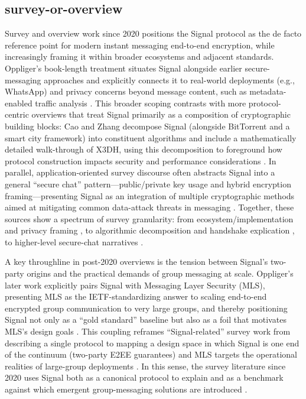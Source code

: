 \subsection{survey-or-overview}
Survey and overview work since 2020 positions the Signal protocol as the de facto reference point for modern instant messaging end-to-end encryption, while increasingly framing it within broader ecosystems and adjacent standards. Oppliger’s book-length treatment situates Signal alongside earlier secure-messaging approaches and explicitly connects it to real-world deployments (e.g., WhatsApp) and privacy concerns beyond message content, such as metadata-enabled traffic analysis \cite{oppliger2020}. This broader scoping contrasts with more protocol-centric overviews that treat Signal primarily as a composition of cryptographic building blocks: Cao and Zhang decompose Signal (alongside BitTorrent and a smart city framework) into constituent algorithms and include a mathematically detailed walk-through of X3DH, using this decomposition to foreground how protocol construction impacts security and performance considerations \cite{cao2022}. In parallel, application-oriented survey discourse often abstracts Signal into a general “secure chat” pattern—public/private key usage and hybrid encryption framing—presenting Signal as an integration of multiple cryptographic methods aimed at mitigating common data-attack threats in messaging \cite{p2023}. Together, these sources show a spectrum of survey granularity: from ecosystem/implementation and privacy framing \cite{oppliger2020}, to algorithmic decomposition and handshake explication \cite{cao2022}, to higher-level secure-chat narratives \cite{p2023}.

A key throughline in post-2020 overviews is the tension between Signal’s two-party origins and the practical demands of group messaging at scale. Oppliger’s later work explicitly pairs Signal with Messaging Layer Security (MLS), presenting MLS as the IETF-standardizing answer to scaling end-to-end encrypted group communication to very large groups, and thereby positioning Signal not only as a “gold standard” baseline but also as a foil that motivates MLS’s design goals \cite{oppliger2024}. This coupling reframes “Signal-related” survey work from describing a single protocol to mapping a design space in which Signal is one end of the continuum (two-party E2EE guarantees) and MLS targets the operational realities of large-group deployments \cite{oppliger2024}. In this sense, the survey literature since 2020 uses Signal both as a canonical protocol to explain and as a benchmark against which emergent group-messaging solutions are introduced \cite{oppliger2024}.

